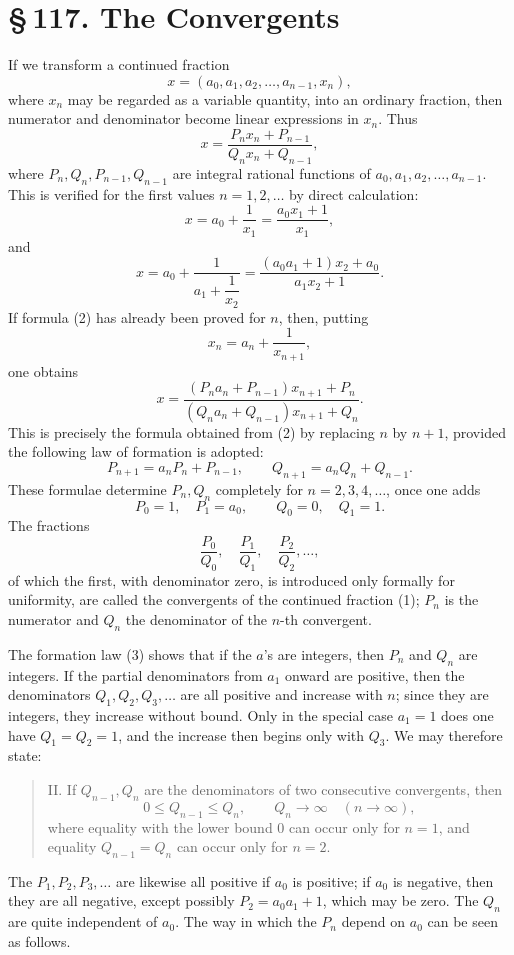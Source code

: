 \documentclass[11pt]{article}
\providecommand{\sect}[2]{\section*{\S\,#1. #2}}
\begin{document}
\sect{117}{The Convergents}

If we transform a continued fraction
\[
\tag{1}        x=(a_0,a_1,a_2,\ldots,a_{n-1},x_n),
\]
where $x_n$ may be regarded as a variable quantity, into an ordinary fraction, then numerator and denominator become linear expressions in $x_n$. Thus
\[
\tag{2}        x=\frac{P_nx_n+P_{n-1}}{Q_nx_n+Q_{n-1}},
\]
where $P_n,Q_n,P_{n-1},Q_{n-1}$ are integral rational functions of $a_0,a_1,a_2,\ldots,a_{n-1}$. This is verified for the first values $n=1,2,\ldots$ by direct calculation:
\[
 x=a_0+\frac1{x_1}=\frac{a_0x_1+1}{x_1},
\]
and
\[
 x=a_0+\frac1{a_1+\dfrac1{x_2}}
  =\frac{(a_0a_1+1)x_2+a_0}{a_1x_2+1}.
\]
If formula (2) has already been proved for $n$, then, putting
\[
        x_n=a_n+\frac1{x_{n+1}},
\]
one obtains
\[
 x=\frac{(P_na_n+P_{n-1})x_{n+1}+P_n}
        {(Q_na_n+Q_{n-1})x_{n+1}+Q_n}.
\]
This is precisely the formula obtained from (2) by replacing $n$ by $n+1$, provided the following law of formation is adopted:
\[
\tag{3}        P_{n+1}=a_nP_n+P_{n-1},\qquad
               Q_{n+1}=a_nQ_n+Q_{n-1}.
\]
These formulae determine $P_n,Q_n$ completely for $n=2,3,4,\ldots$, once one adds
\[
\tag{4}        P_0=1,\quad P_1=a_0,\qquad
               Q_0=0,\quad Q_1=1.
\]
The fractions
\[
        \frac{P_0}{Q_0},\quad \frac{P_1}{Q_1},\quad \frac{P_2}{Q_2},\ldots,
\]
of which the first, with denominator zero, is introduced only formally for uniformity, are called the convergents of the continued fraction (1); $P_n$ is the numerator and $Q_n$ the denominator of the $n$-th convergent.

The formation law (3) shows that if the $a$'s are integers, then $P_n$ and $Q_n$ are integers. If the partial denominators from $a_1$ onward are positive, then the denominators $Q_1,Q_2,Q_3,\ldots$ are all positive and increase with $n$; since they are integers, they increase without bound. Only in the special case $a_1=1$ does one have $Q_1=Q_2=1$, and the increase then begins only with $Q_3$. We may therefore state:

\begin{quote}
II. If $Q_{n-1},Q_n$ are the denominators of two consecutive convergents, then
\[
        0\le Q_{n-1}\le Q_n,
        \qquad
        Q_n\to\infty\quad(n\to\infty),
\]
where equality with the lower bound $0$ can occur only for $n=1$, and equality $Q_{n-1}=Q_n$ can occur only for $n=2$.
\end{quote}

The $P_1,P_2,P_3,\ldots$ are likewise all positive if $a_0$ is positive; if $a_0$ is negative, then they are all negative, except possibly $P_2=a_0a_1+1$, which may be zero. The $Q_n$ are quite independent of $a_0$. The way in which the $P_n$ depend on $a_0$ can be seen as follows.
\end{document}
